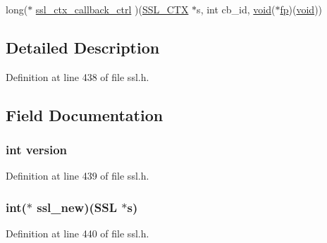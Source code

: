\begin{DoxyCompactItemize}
\item 
long($\ast$ \hyperlink{structssl__method__st_afb4acab11f788cc0abd0b1b19cb7e98a}{ssl\+\_\+ctx\+\_\+callback\+\_\+ctrl} )(\hyperlink{crypto_2ossl__typ_8h_a1a21892c1193ee6eb572c2c72d3924ca}{S\+S\+L\+\_\+\+C\+TX} $\ast$s, int cb\+\_\+id, \hyperlink{hw__4758__cca_8h_afad4d591c7931ff6dc5bf69c76c96aa0}{void}($\ast$\hyperlink{include_2openssl_2conf_8h_aa065f30aa9f5f9a42132c82c787ee70b}{fp})(\hyperlink{hw__4758__cca_8h_afad4d591c7931ff6dc5bf69c76c96aa0}{void}))
\end{DoxyCompactItemize}


\subsection{Detailed Description}


Definition at line 438 of file ssl.\+h.



\subsection{Field Documentation}
\subsubsection[{\texorpdfstring{version}{version}}]{\setlength{\rightskip}{0pt plus 5cm}int version}\hypertarget{structssl__method__st_aad880fc4455c253781e8968f2239d56f}{}\label{structssl__method__st_aad880fc4455c253781e8968f2239d56f}


Definition at line 439 of file ssl.\+h.

\subsubsection[{\texorpdfstring{ssl\+\_\+new}{ssl_new}}]{\setlength{\rightskip}{0pt plus 5cm}int($\ast$ ssl\+\_\+new)({\bf S\+SL} $\ast$s)}\hypertarget{structssl__method__st_af01b1a29fdeb66e611dca725caecdfcd}{}\label{structssl__method__st_af01b1a29fdeb66e611dca725caecdfcd}


Definition at line 440 of file ssl.\+h.

